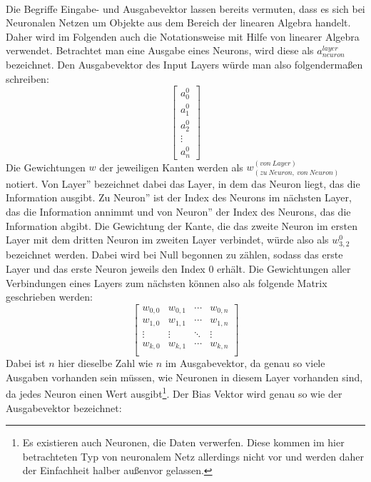 \documentclass[11pt]{article}
\begin{document}
\\
Die Begriffe Eingabe- und Ausgabevektor lassen bereits vermuten, dass es sich bei Neuronalen Netzen um Objekte aus dem Bereich der linearen Algebra handelt. Daher wird im Folgenden auch die Notationsweise mit Hilfe von linearer Algebra verwendet. Betrachtet man eine Ausgabe eines Neurons, wird diese als $a^ {layer}_{neuron}$ bezeichnet. Den Ausgabevektor des Input Layers würde man also folgendermaßen schreiben:
\begin{equation*}
\begin{bmatrix}
	a^0_0\\
	a^0_1\\
	a^0_2\\
	\vdots\\
	a^0_n
\end{bmatrix}
\end{equation*}
Die Gewichtungen $w$ der jeweiligen Kanten werden als $w^{(von\ Layer)}_{(zu\ Neuron,\ von\ Neuron)}$ notiert. \glqq Von Layer'' bezeichnet dabei das Layer, in dem das Neuron liegt, das die Information ausgibt. \glqq Zu Neuron'' ist der Index des Neurons im nächsten Layer, das die Information annimmt und \glqq von Neuron'' der Index des Neurons, das die Information abgibt. Die Gewichtung der Kante, die das zweite Neuron im ersten Layer mit dem dritten Neuron im zweiten Layer verbindet, würde also als $w^0_{3,2}$ bezeichnet werden. Dabei wird bei Null begonnen zu zählen, sodass das erste Layer und das erste Neuron jeweils den Index 0 erhält.\newline
Die Gewichtungen aller Verbindungen eines Layers zum nächsten können also als folgende Matrix geschrieben werden:
\begin{equation*}
	\begin{bmatrix}
	w_{0,0} & w_{0,1} & \cdots & w_{0,n}\\
	w_{1,0} & w_{1,1} & \cdots & w_{1,n}\\
	\vdots & \vdots & \ddots & \vdots\\
	w_{k,0} & w_{k,1} & \cdots & w_{k,n}\\
	\end{bmatrix}
\end{equation*}
Dabei ist $n$ hier dieselbe Zahl wie $n$ im Ausgabevektor, da genau so viele Ausgaben vorhanden sein müssen, wie Neuronen in diesem Layer vorhanden sind, da jedes Neuron einen Wert ausgibt\footnote{Es existieren auch Neuronen, die Daten verwerfen. Diese kommen im hier betrachteten Typ von neuronalem Netz allerdings nicht vor und werden daher der Einfachheit halber außenvor gelassen.}. Der Bias Vektor wird genau so wie der Ausgabevektor bezeichnet:
\end{document}
